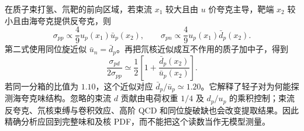 \begin{exbox}[海夸克不对称的近似读取]
在质子束打氢、氘靶的前向区域，若束流 $x_1$ 较大且由 $u$ 价夸克主导，靶端 $x_2$ 较小且由海夸克提供反夸克，则
\begin{equation*}
 \sigma_{pp}\propto\frac49u_p(x_1)\bar u_p(x_2),\qquad
 \sigma_{pn}\propto\frac49u_p(x_1)\bar d_p(x_2).
\end{equation*}
第二式使用同位旋近似 $\bar u_n=\bar d_p$。再把氘核近似成互不作用的质子加中子，得到
\begin{equation}
 \frac{\sigma_{pd}}{2\sigma_{pp}}
 \simeq\frac12\left[1+\frac{\bar d_p(x_2)}{\bar u_p(x_2)}\right].
 \label{eq:dy-sea-asymmetry-ratio}
\end{equation}
若同一分箱的比值为 $1.10$，这个近似对应 $\bar d_p/\bar u_p\simeq1.20$。它解释了轻子对为何能探测海夸克味结构。忽略的束流 $d$ 贡献由电荷权重 $1/4$ 及 $d_p/u_p$ 的乘积控制；束流反夸克、氘核束缚与卷积效应、高阶 QCD 和同位旋破缺也会改变提取结果。因此精确分析应回到完整味和及核 PDF，而不能把这个读数当作无模型测量。
\end{exbox}
